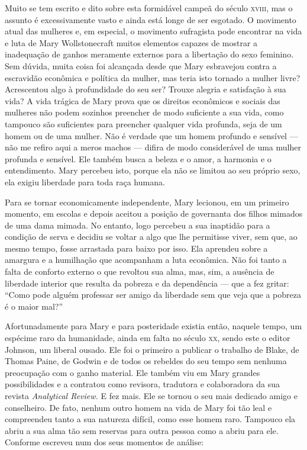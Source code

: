 Muito se tem escrito e dito sobre esta formidável campeã do século \textsc{xviii}, mas o
assunto é excessivamente vasto e ainda está longe de ser esgotado. O movimento
atual das mulheres e, em especial, o movimento sufragista pode encontrar
na vida e luta de Mary Wollstonecraft muitos elementos capazes de
mostrar a inadequação de ganhos meramente externos para a libertação do
sexo feminino. Sem dúvida, muita coisa foi alcançada desde que Mary
esbravejou contra a escravidão econômica e política da mulher, mas teria
isto tornado a mulher livre? Acrescentou algo à profundidade do seu
ser? Trouxe alegria e satisfação à sua vida? A vida trágica de Mary
prova que os direitos econômicos e sociais das mulheres não podem
sozinhos preencher de modo suficiente a sua vida, como tampouco são
suficientes para preencher qualquer vida profunda, seja de um homem ou
de uma mulher. Não é verdade que um homem profundo e sensível --- não me
refiro aqui a meros machos --- difira de modo considerável de uma mulher
profunda e sensível. Ele também busca a beleza e o amor, a harmonia e o
entendimento. Mary percebeu isto, porque ela não se limitou ao seu
próprio sexo, ela exigiu liberdade para toda raça humana.

Para se tornar economicamente independente, Mary lecionou, em um
primeiro momento, em escolas e depois aceitou a posição de governanta
dos filhos mimados de uma dama mimada. No entanto, logo percebeu a sua
inaptidão para a condição de serva e decidiu se voltar a algo que lhe
permitisse viver, sem que, ao mesmo tempo, fosse arrastada para baixo
por isso. Ela aprendeu sobre a amargura e a humilhação que acompanham a
luta econômica. Não foi tanto a falta de conforto externo o que revoltou
sua alma, mas, sim, a ausência de liberdade interior que resulta da
pobreza e da dependência --- que a fez gritar: ``Como pode alguém
professar ser amigo da liberdade sem que veja que a pobreza é o maior
mal?''

Afortunadamente para Mary e para posteridade existia então, naquele
tempo, um espécime raro da humanidade, ainda em falta no século \textsc{xx},
sendo este o editor Johnson, um liberal ousado. Ele foi o primeiro a
publicar o trabalho de Blake, de Thomas Paine, de Godwin e de todos os
rebeldes do seu tempo sem nenhuma preocupação com o ganho material. Ele
também viu em Mary grandes possibilidades e a contratou como revisora,
tradutora e colaboradora da sua revista \emph{Analytical Review.} E fez
mais. Ele se tornou o seu mais dedicado amigo e conselheiro. De fato,
nenhum outro homem na vida de Mary foi tão leal e compreendeu tanto a
sua natureza difícil, como esse homem raro. Tampouco ela abriu a sua
alma tão sem reservas para outra pessoa como a abriu para ele. Conforme
escreveu num dos seus momentos de análise:

